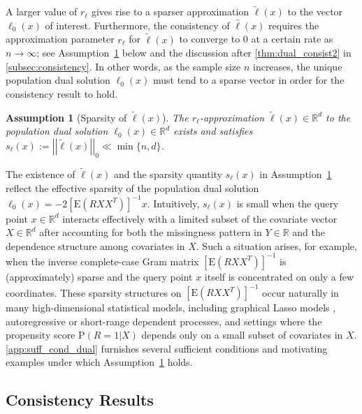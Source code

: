 \documentclass[ejsv2,noshowframe]{imsart}
\theoremstyle{plain}
\newtheorem{assumption}{Assumption}
\theoremstyle{definition}
\theoremstyle{remark}
\newcommand{\norm}[1]{\left|\left| #1 \right|\right|}
\renewcommand{\hat}{\widehat}
\renewcommand{\tilde}{\widetilde}
\begin{document}
A larger value of $r_{\ell}$ gives rise to a sparser approximation $\tilde{\ell}(x)$ to the vector $\ell_0(x)$ of interest. Furthermore, the consistency of $\hat{\ell}(x)$ requires the approximation parameter $r_{\ell}$ for $\tilde{\ell}(x)$ to converge to 0 at a certain rate as $n\to \infty$; see Assumption~\ref{assump:sparse_dual} below and the discussion after \autoref{thm:dual_consist2} in \autoref{subsec:consistency}. In other words, as the sample size $n$ increases, the unique population dual solution $\ell_0(x)$ must tend to a sparse vector in order for the consistency result to hold.

\begin{assumption}[Sparsity of $\tilde{\ell}(x)$]
	\label{assump:sparse_dual}
	The $r_{\ell}$-approximation $\tilde{\ell}(x) \in \mathbb{R}^d$ to the population dual solution $\ell_0(x)\in \mathbb{R}^d$ exists and satisfies
	$s_{\ell}(x) := \norm{\tilde{\ell}(x)}_0 \ll \min\{n,d\}$.
\end{assumption}

The existence of $\tilde{\ell}(x)$ and the sparsity quantity $s_{\ell}(x)$ in Assumption~\ref{assump:sparse_dual} reflect the effective sparsity of the population dual solution $\ell_0(x)=-2\left[\mathrm{E}\left(R XX^T\right)\right]^{-1} x$. 
Intuitively, $s_{\ell}(x)$ is small when the query point $x\in \mathbb{R}^d$ interacts effectively with a limited subset of the covariate vector $X\in \mathbb{R}^d$ after accounting for both the missingness pattern in $Y \in \mathbb{R}$ and the dependence structure among covariates in $X$. Such a situation arises, for example, when the inverse complete-case Gram matrix $\left[\mathrm{E}\left(R XX^T\right)\right]^{-1}$ is (approximately) sparse and the query point $x$ itself is concentrated on only a few coordinates. These sparsity structures on $\left[\mathrm{E}\left(R XX^T\right)\right]^{-1}$ occur naturally in many high-dimensional statistical models, including graphical Lasso models \citep{friedman2008sparse}, autoregressive or short-range dependent processes, and settings where the propensity score $\mathrm{P}(R=1|X)$ depends only on a small subset of covariates in $X$. \autoref{app:suff_cond_dual} furnishes several sufficient conditions and motivating examples under which Assumption~\ref{assump:sparse_dual} holds.


\subsection{Consistency Results}
\label{subsec:consistency}
\end{document}
